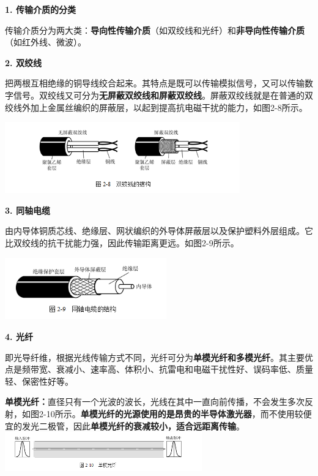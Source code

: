 {\textbf{1. 传输介质的分类}}

{传输介质分为两大类：}{\textbf{{导向性传输介质}}（如双绞线和光纤）和\textbf{{非导向性传输介质}}（如红外线、微波）。}

{\textbf{2. 双绞线}}

把两根互相绝缘的铜导线绞合起来。其特点是既可以传输模拟信号，又可以传输数字信号。{双绞线又可分为}\textbf{{无屏蔽双绞线和屏蔽双绞线}}{。屏蔽双绞线就是在普通的双绞线外加上金属丝编织的屏蔽层，以起到提高抗电磁干扰的能力，如图2-8所示。}

\includegraphics[width=4.00000in,height=1.20833in]{png-jpeg-pics/83D05E79CEEF97DB4600E5A2E01AF609.png}

\textbf{{3. 同轴电缆}}

由内导体铜质芯线、绝缘层、网状编织的外导体屏蔽层以及保护塑料外层组成。它比双绞线的抗干扰能力强，因此传输距离更远。如图2-9所示。

\includegraphics[width=2.75000in,height=1.05208in]{png-jpeg-pics/1D1DB4FC651BA5851336A50535D58EA2.png}

\textbf{{4. 光纤}}

即光导纤维，根据光线传输方式不同，光纤可分为\textbf{单模光纤和多模光纤}。其主要优点是频带宽、衰减小、速率高、体积小、抗雷电和电磁干扰性好、误码率低、质量轻、保密性好等。

\textbf{单模光纤：}直径只有一个光波的波长，光线在其中一直向前传播，不会发生多次反射，如图2-10所示。\textbf{单模光纤的光源使用的是昂贵的半导体激光器}，而不使用较便宜的发光二极管，因此\textbf{单模光纤的衰减较小，适合远距离传输}。\\
\includegraphics[width=3.35417in,height=0.66667in]{png-jpeg-pics/3F2AFE1999272C72B4C49C9C5C82E862.png}

